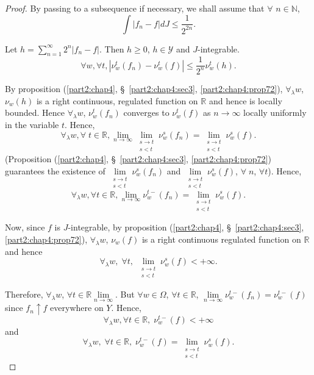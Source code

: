 \begin{proof}
By passing to a subsequence if necessary, we shall assume that
$\forall$ $n\in \mathbb{N}$,
$$
\int|f_n-f| d J \leq \frac{1}{2^{2n}}. 
$$

Let $h = \sum\limits^\infty_{n=1} 2^n |f_n -f|$. Then $h \geq 0$, $h
\in \mathscr{Y}$ and $J$-integrable.
$$
\forall w, \forall t, |\nu^t_w(f_n) - \nu^t_w(f)| \leq \frac{1}{2^n}
\nu^t_w(h). 
$$

By proposition (\ref{part2:chap4}, \S\ \ref{part2:chap4:sec3},
\ref{part2:chap4:prop72}), $\forall_\lambda w$, $\nu_w(h)$ is a 
right continuous, regulated function on $\mathbb{R}$ and hence is
locally bounded. Hence $\forall_\lambda w$, $\nu^t_w(f_n)$ converges
to $\nu^t_w(f)$ as $n \to \infty$ locally uniformly in the variable
$t$. Hence, 
$$
\forall_\lambda w, \forall \; t \in \mathbb{R}, \lim\limits_{n \to
  \infty} \lim\limits_{\substack{s \to t\\s<t}} \nu^s_w(f_n) =
\lim\limits_{\substack{s \to t\\s<t}}  \nu^s_w(f). 
$$
(Proposition (\ref{part2:chap4}, \S\ \ref{part2:chap4:sec3},
\ref{part2:chap4:prop72}) guarantees the existence of 
$\lim\limits_{\substack{s \to t\\s<t}} \nu^s_w(f_n)$ and\break
$\lim\limits_{\substack{s\to t\\s < t}} \nu^s_w(f)$, $\forall \; n$,
$\forall t$). Hence,
$$
\forall_\lambda w, \forall t \in\mathbb{R}, \lim\limits_{n \to \infty}
\nu^{t-}_w(f_n) = \lim\limits_{\substack{s \to t\\s<t}} \nu^s_w(f). 
$$ 

Now, since $f$ is $J$-integrable, by proposition (\ref{part2:chap4},
\S\ \ref{part2:chap4:sec3}, \ref{part2:chap4:prop72}), 
$\forall_\lambda w$, $\nu_w(f)$ is a right continuous regulated
function on $\mathbb{R}$ and hence
$$
\forall_\lambda w, \; \forall t,  \; \lim\limits_{\substack{s\to
    t\\s<t}} \nu^s_w(f) < + \infty. 
$$

Therefore, $\forall_\lambda w$, $\forall t \in \mathbb{R}
\lim\limits_{n \to \infty}$. But $\forall w \in \Omega$, $\forall t
\in \mathbb{R}$, $\lim\limits_{n \to \infty} \nu^{t-}_w(f_n) =
\nu^{t-}_w(f)$ since $f_n \uparrow f$ everywhere on $Y$. Hence,
$$
\forall_\lambda w, \forall t \in \mathbb{R}, \; \nu^{t-}_w(f) < +
\infty 
$$
and
$$
\forall_\lambda w, \; \forall t \in \mathbb{R}, \; \nu^{t-}_w(f) =
\lim\limits_{\substack{s\to t\\s<t}} \nu^s_w(f). 
$$
\end{proof}

